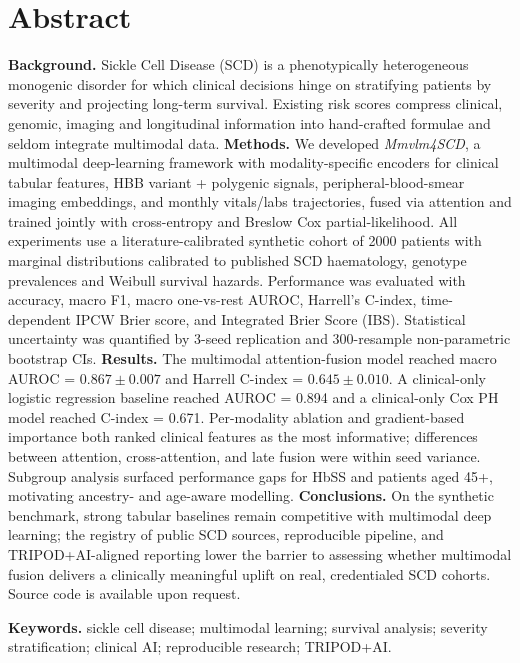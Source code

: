 \documentclass[11pt,a4paper]{article}
\begin{document}
\section*{Abstract}\nolinenumbers
\noindent\textbf{Background.} Sickle Cell Disease (SCD) is a phenotypically heterogeneous monogenic disorder for which clinical decisions hinge on stratifying patients by severity and projecting long-term survival. Existing risk scores compress clinical, genomic, imaging and longitudinal information into hand-crafted formulae and seldom integrate multimodal data.
\noindent\textbf{Methods.} We developed \textit{Mmvlm4SCD}, a multimodal deep-learning framework with modality-specific encoders for clinical tabular features, HBB variant + polygenic signals, peripheral-blood-smear imaging embeddings, and monthly vitals/labs trajectories, fused via attention and trained jointly with cross-entropy and Breslow Cox partial-likelihood. All experiments use a literature-calibrated synthetic cohort of 2000 patients with marginal distributions calibrated to published SCD haematology, genotype prevalences and Weibull survival hazards. Performance was evaluated with accuracy, macro F1, macro one-vs-rest AUROC, Harrell's C-index, time-dependent IPCW Brier score, and Integrated Brier Score (IBS). Statistical uncertainty was quantified by 3-seed replication and 300-resample non-parametric bootstrap CIs.
\noindent\textbf{Results.} The multimodal attention-fusion model reached macro AUROC = $0.867 \pm 0.007$ and Harrell C-index = $0.645 \pm 0.010$. A clinical-only logistic regression baseline reached AUROC = 0.894 and a clinical-only Cox PH model reached C-index = 0.671. Per-modality ablation and gradient-based importance both ranked clinical features as the most informative; differences between attention, cross-attention, and late fusion were within seed variance. Subgroup analysis surfaced performance gaps for HbSS and patients aged 45+, motivating ancestry- and age-aware modelling.
\noindent\textbf{Conclusions.} On the synthetic benchmark, strong tabular baselines remain competitive with multimodal deep learning; the registry of public SCD sources, reproducible pipeline, and TRIPOD+AI-aligned reporting lower the barrier to assessing whether multimodal fusion delivers a clinically meaningful uplift on real, credentialed SCD cohorts. Source code is available upon request.

\noindent\textbf{Keywords.} sickle cell disease; multimodal learning; survival analysis; severity stratification; clinical AI; reproducible research; TRIPOD+AI.
\linenumbers
\end{document}
